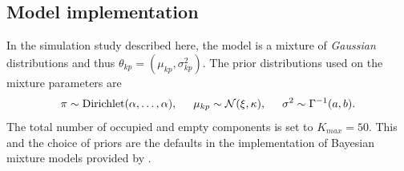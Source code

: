 \documentclass{bioinfo}
\begin{document}
\begin{methods}
\subsection{Model implementation}
In the simulation study described here, the model is a mixture of \emph{Gaussian} distributions and thus \(\theta_{kp}=(\mu_{kp}, \sigma^2_{kp})\). The prior distributions used on the mixture parameters are
\begin{align}
	\pi \sim \textrm{Dirichlet}(\alpha, \ldots, \alpha), \hspace{0.5cm} \mu_{kp} \sim \mathcal{N}(\xi, \kappa), \hspace{0.5cm} \sigma^2 \sim \Gamma^{-1}(a, b). \nonumber
\end{align}
The total number of occupied and empty components is set to $K_{max}=50$. This and the choice of priors are the defaults in the implementation of Bayesian mixture models provided by \cite{mason2016mdi}.


\end{methods}
\end{document}

